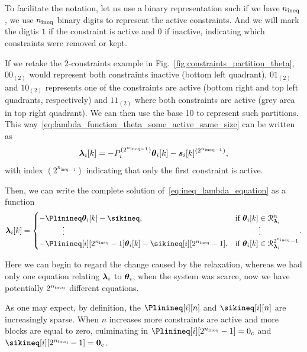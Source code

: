 \documentclass[../main.tex]{subfiles}
\begin{document}
To facilitate the notation, let us use a binary representation such if we have $n_{\text{ineq}}$, we use $n_{\text{ineq}}$ binary digits to represent the active constraints.
And we will mark the digtis $1$ if the constraint is active and $0$ if inactive, indicating which constraints were removed or kept.

If we retake the $2$-constraints example in Fig.~\ref{fig:constraints_partition_theta}, ${00}_{(2)}$ would represent both constraints inactive (bottom left quadrant), ${01}_{(2)}$ and ${10}_{(2)}$ represents one of the constraints are active (bottom right and top left quadrants, respectively) and ${11}_{(2)}$ where both constraints are active (grey area in top right quadrant).
We can then use the base 10 to represent such partitions.
This way~\eqref{eq:lambda_function_theta_some_active_same_size} can be written as
\begin{equation}
  \label{eq:lambda_function_theta_same_size_coded}
  \lambdaik=-\Plin^{(2^{n_{\text{ineq}-1}})}\thetaik-\sik^{(2^{n_{\text{ineq}-1}})},
\end{equation}
with index $(2^{n_{\text{ineq}-1}})$ indicating that only the first constraint is active.

Then, we can write the complete solution of~\eqref{eq:ineq_lambda_equation} as
a \pwa{} function
\begin{equation}
  \label{eq:lambdafuntheta}
  \begin{aligned}
    \lambdaik=
    \begin{cases}
      -\Plinineq\thetaik-\sikineq,&\text{if}\ \thetaik \in\set{R}_{\lambdai}^{n}\\
      \qquad\quad \vdots&\qquad\quad \vdots\\
      -\Plinineq[i][2^{\nineq}-1]\thetaik-\sikineq[i][2^{\nineq}-1],&\text{if}\ \thetaik \in\set{R}_{\lambdai}^{2^{\nineq}-1}\\
    \end{cases}
  \end{aligned}.
\end{equation}

Here we can begin to regard the change caused by the relaxation, whereas we had only one equation relating $\boldsymbol{\lambda}_i$ to $\boldsymbol{\theta}_i$, when the system was scarce, now we have potentially $2^{n_{\text{ineq}}}$ different equations.

\begin{remark}\label{rem:sparse_solutions}
  As one may expect, by definition, the $\Plinineq[i][n]$ and $\sikineq[i][n]$ are increasingly sparse.
  When $n$ increases more constraints are active and more blocks are equal to zero, culminating in $\Plinineq[i][2^{\nineq}-1]=0_{c}$ and $\sikineq[i][2^{\nineq}-1]=\0_{c}$.
\end{remark}
\end{document}
